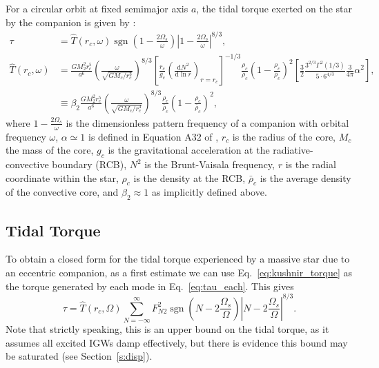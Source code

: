 \documentclass[
        fleqn,
        usenatbib,
        referee,
    ]{mnras}
\newcommand*{\rd}[2]{\frac{\mathrm{d}#1}{\mathrm{d}#2}}
\newcommand*{\abs}[1]{\left|#1\right|}
\newcommand*{\p}[1]{\left(#1\right)}
\newcommand*{\s}[1]{\left[#1\right]}
\DeclareMathOperator*{\sgn}{sgn}
\begin{document}
For a circular orbit at fixed semimajor axis $a$, the tidal torque exerted on
the star by the companion is given by \citealt{kushnir}:
\begin{align}
    \tau &= \hat{T}(r_c, \omega) \sgn\p{1 - \frac{2\Omega_s}{\omega}}
        \abs{1 - \frac{2\Omega_s}{\omega}}^{8/3}
            \label{eq:kushnir_torque},\\
    \hat{T}(r_c, \omega) &= \frac{GM_2^2r_c^5}{a^6}
        \p{\frac{\omega}{\sqrt{GM_c/r_c^3}}}^{8/3}
        \s{\frac{r_c}{g_c}\p{\rd{N^2}{\ln r}}_{r = r_c}}^{-1/3}
            \frac{\rho_c}{\bar{\rho}_c} \p{1 - \frac{\rho_c}{\bar{\rho}_c}}^2
            \s{\frac{3}{2}\frac{3^{2/3}\Gamma^2(1/3)}{5 \cdot
                6^{4/3}} \frac{3}{4\pi}\alpha^2},\nonumber\\
        &\equiv \beta_2\frac{GM_2^2r_c^5}{a^6}
            \p{\frac{\omega}{\sqrt{GM_c/r_c^3}}}^{8/3}
            \frac{\rho_c}{\bar{\rho}_c} \p{1 - \frac{\rho_c}{\bar{\rho}_c}}^2,
\end{align}
where $1 - \frac{2\Omega_s}{\omega}$ is the dimensionless pattern frequency of a
companion with orbital frequency $\omega$, $\alpha \simeq 1$ is defined in
Equation A32 of \citealt{kushnir}, $r_c$ is the radius
of the core, $M_c$ the mass of the core, $g_c$ is the gravitational acceleration at
the radiative-convective boundary (RCB), $N^2$ is the Brunt-Vaisala frequency, $r$
is the radial coordinate within the star, $\rho_c$ is the density at the RCB,
$\bar{\rho}_c$ is the average density of the convective core, and $\beta_2
\approx 1$ as implicitly defined above.

\subsection{Tidal Torque}

To obtain a closed form for the tidal torque experienced by a massive star due
to an eccentric companion, as a first estimate we can use
Eq.~\eqref{eq:kushnir_torque} as the torque generated by each mode in
Eq.~\eqref{eq:tau_each}. This gives
\begin{equation}
    \tau = \hat{T}(r_c, \Omega) \sum\limits_{N = -\infty}^\infty
        F_{N2}^2 \sgn\p{N - 2\frac{\Omega_s}{\Omega}}
            \abs{N - 2\frac{\Omega_s}{\Omega}}^{8/3}.\label{eq:tau_sum}
\end{equation}
Note that strictly speaking, this is an upper bound on the tidal torque, as it
assumes all excited IGWs damp effectively, but there is evidence this bound may
be saturated (see Section~\ref{s:disp}).
\end{document}
